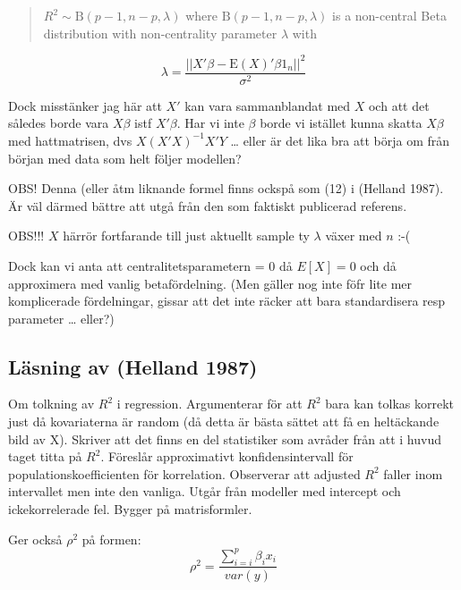 \documentclass[]{article}
\begin{document}
\begin{quote}
\(R^2\sim\mathrm{B}(p-1,n-p,\lambda)\) where
\(\mathrm{B}(p-1,n-p,\lambda)\) is a non-central Beta distribution with
non-centrality parameter \(\lambda\) with
\end{quote}

\[\lambda=\frac{||X'\beta-\mathrm{E}(X)'\beta1_n||^2}{\sigma^2}\]

Dock misstänker jag här att \(X'\) kan vara sammanblandat med \(X\) och
att det således borde vara \(X \beta\) istf \(X' \beta\). Har vi inte
\(\beta\) borde vi istället kunna skatta \(X\beta\) med hattmatrisen,
dvs \(X(X'X)^{-1}X'Y\) \ldots{} eller är det lika bra att börja om från
början med data som helt följer modellen?

OBS! Denna (eller åtm liknande formel finns ockspå som (12) i (Helland
1987). Är väl därmed bättre att utgå från den som faktiskt publicerad
referens.

OBS!!! \(X\) härrör fortfarande till just aktuellt sample ty \(\lambda\)
växer med \(n\) :-(

Dock kan vi anta att centralitetsparametern = 0 då \(E[X] = 0\) och då
approximera med vanlig betafördelning. (Men gäller nog inte föfr lite
mer komplicerade fördelningar, gissar att det inte räcker att bara
standardisera resp parameter \ldots{} eller?)

\subsection{Läsning av (Helland 1987)}\label{lasning-av-helland1987}

Om tolkning av \(R^2\) i regression. Argumenterar för att \(R^2\) bara
kan tolkas korrekt just då kovariaterna är random (då detta är bästa
sättet att få en heltäckande bild av X). Skriver att det finns en del
statistiker som avråder från att i huvud taget titta på \(R^2\).
Föreslår approximativt konfidensintervall för populationskoefficienten
för korrelation. Observerar att adjusted \(R^2\) faller inom intervallet
men inte den vanliga. Utgår från modeller med intercept och
ickekorrelerade fel. Bygger på matrisformler.

Ger också \(\rho^2\) på formen:
\[\rho^2 = \frac{\sum_{i = i}^p \beta_ix_i}{var(y)}\]
\end{document}
